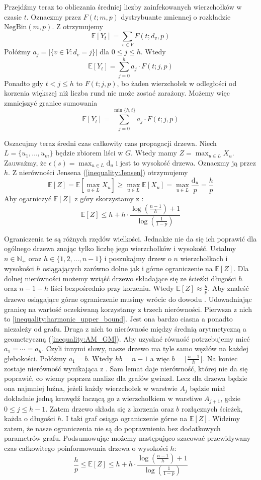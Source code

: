 Przejdźmy teraz to obliczania średniej liczby zainfekowanych wierzchołków w czasie $t$. Oznaczmy przez $F(t;m,p)$ dystrybuante zmiennej o rozkładzie $\mathrm{NegBin}(m,p)$. Z  otrzymujemy
\[
    \mathbb{E}[Y_t] = \sum_{v\in V} F(t; d_v, p)
\]
Połóżmy $a_j = |\{v\in V: d_v=j\}|$ dla $0\le j \le h$. Wtedy 
\[
    \mathbb{E}[Y_t] = \sum_{j=0}^{h} a_j\cdot F(t; j, p)
\]
Ponadto gdy $t<j\le h$ to $F(t; j, p)$, bo żaden wierzchołek w odległości od korzenia większej niż liczba rund nie może zostać zarażony. Możemy więc zmniejszyć granice sumowania 
\[
    \mathbb{E}[Y_t] = \sum_{j=0}^{\min\{h,t\}} a_j\cdot F(t; j, p)
\]

Oszacujmy teraz średni czas całkowity czas propagacji drzewa.
Niech $L=\{u_1,\dots, u_m\}$ będzie zbiorem liści w $G$. Wtedy mamy $Z = \max_{u\in L} X_{u}$.
Zauważmy, że $\epsilon(s) = \max_{u\in L} \mathrm{d}_{u}$ i jest to wysokość drzewa. Oznaczmy ją przez $h$. Z nierówności Jensena (\ref{inequality:Jensen}) otrzymujemy
\[
    \mathbb{E}[Z]=\mathbb{E}[\max_{u\in L} X_{u}] \ge \max_{u\in L} \mathbb{E}[X_{u}] = \max_{u\in L} \frac{\mathrm{d}_{u}}{p} = \frac{h}{p}
\]
Aby ogarniczyć $\mathbb{E}[Z]$ z góry skorzystamy z :
\[
    \mathbb{E}[Z] \le h  + h \cdot \frac{\log(\frac{n-1}{h}) + 1}{\log(\frac{1}{1-p})}
\]

Ograniczenia te są różnych rzędów wielkości. Jednakże nie da się ich poprawić dla ogólnego drzewa znając tylko liczbę jego wierzchołków i wysokość. Ustalmy $n\in\mathbb{N}_+$ oraz $h\in\{1,2,\dots,n-1\}$ i poszukajmy drzew o $n$ wierzchołkach i wysokości $h$ osiągających zarówno dolne jak i górne ograniczenie na $\mathbb{E}[Z]$. Dla dolnej nierówności możemy wziąść drzewo składające się ze ścieżki długości $h$ oraz $n-1-h$ liści bezpośrednio przy korzeniu. Wtedy $\mathbb{E}[Z] \approx \frac{h}{p}$. Aby znaleść drzewo osiągające górne ograniczenie musimy wrócic do dowodu . Udowadniając granicę na wartość oczekiwaną korzystamy z trzech nierówności. Pierwsza z nich to \cref{inequality:harmonic_upper_bound}. Jest ona bardzo ciasna a ponadto niezależy od grafu. Druga z nich to nierównośc między średnią arytmetyczną a geometryczną (\ref{inequality:AM_GM}). Aby uzyskać równość potrzebujemy mieć $a_1=\cdots=a_h$. Czyli innymi słowy, nasze drzewo ma tyle samo węzłów na każdej głebokości. Połóżmy $a_1=b$. Wtedy $hb=n-1$ a więc $b=\lfloor\frac{n-1}{h}\rfloor$. Na koniec zostaje nierówność wynikająca z . Sam lemat daje nierówność, której nie da się poprawić, co wiemy poprzez analize dla grafów gwiazd. Lecz dla drzewa będzie ona najmniej luźna, jeżeli każdy wierzchołek w warstwie $A_j$ będzie miał dokładnie jedną krawędź łaczącą go z wierzchołkiem w warstiwe $A_{j+1}$, gdzie $0\le j\le h-1$. Zatem drzewo składa się z korzenia oraz $b$ rozłącznych ścieżek, każda o długości $h$. I taki graf osiąga ograniczenie górne na $\mathbb{E}[Z]$. Widzimy zatem, że nasze ograniczenia nie są do poprawnienia bez dodatkowych parametrów grafu. Podsumowując możemy następująco szacować przewidywany czas całkowitego poinformowania drzewa o wysokości $h$:
\[
    \frac{h}{p} \le \mathbb{E}[Z] \le h  + h \cdot \frac{\log(\frac{n-1}{h}) + 1}{\log(\frac{1}{1-p})}
\]